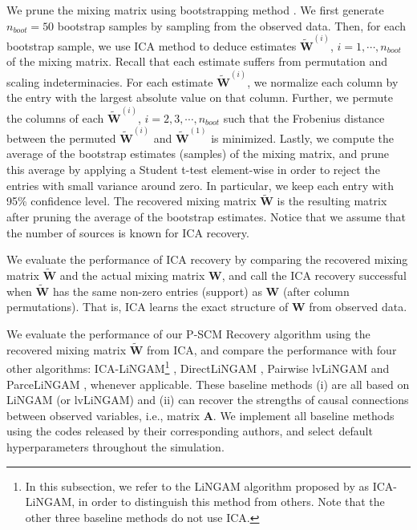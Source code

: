 \documentclass[12pt]{article}
\newcommand{\bA}{\mathbf{A}}
\newcommand{\bW}{\mathbf{W}}
\begin{document}
We prune the mixing matrix using bootstrapping method \citep{efron1994introduction}. We first generate $n_{boot}=50$ bootstrap samples by sampling from the observed data. Then, for each bootstrap sample, we use ICA method to deduce estimates $\tilde{\bW}^{(i)}$, $i=1,\cdots,n_{boot}$ of the mixing matrix. Recall that each estimate suffers from permutation and scaling indeterminacies. For each estimate $\tilde{\bW}^{(i)}$, we normalize each column by the entry with the largest absolute value on that column. Further, we permute the columns of each $\tilde{\bW}^{(i)}$, $i=2,3,\cdots,n_{boot}$ such that the Frobenius distance between the permuted $\tilde{\bW}^{(i)}$ and $\tilde{\bW}^{(1)}$ is minimized. Lastly, we compute the average of the bootstrap estimates (samples) of the mixing matrix, and prune this average by applying a Student t-test element-wise in order to reject the entries with small variance around zero. In particular, we keep each entry with 95\% confidence level. The recovered mixing matrix $\tilde{\bW}$ is the resulting matrix after pruning the average of the bootstrap estimates. Notice that we assume that the number of sources is known for ICA recovery. 

We evaluate the performance of ICA recovery by comparing the recovered mixing matrix $\tilde{\bW}$ and the actual mixing matrix $\bW$, and call the ICA recovery successful when $\tilde{\bW}$ has the same non-zero entries (support) as $\mathbf{W}$ (after column permutations). That is, ICA learns the exact structure of $\mathbf{W}$ from observed data.


We evaluate the performance of our P-SCM Recovery algorithm using the recovered mixing matrix $\tilde{\bW} $ from ICA, and compare the performance with four other algorithms: ICA-LiNGAM\footnote{In this subsection, we refer to the LiNGAM algorithm proposed by \citep{shimizu2006linear} as ICA-LiNGAM, in order to distinguish this method from others. Note that the other three baseline methods do not use ICA.} \citep{shimizu2006linear}, DirectLiNGAM \citep{shimizu2011directlingam}, Pairwise lvLiNGAM \citep{entner2010discovering} and ParceLiNGAM \citep{tashiro2014parcelingam}, whenever applicable. These baseline methods (i) are all based on LiNGAM (or lvLiNGAM) and (ii) can recover the strengths of causal connections between observed variables, i.e., matrix $\bA$. We implement all baseline methods using the codes released by their corresponding authors, and select default hyperparameters throughout the simulation.
\end{document}
